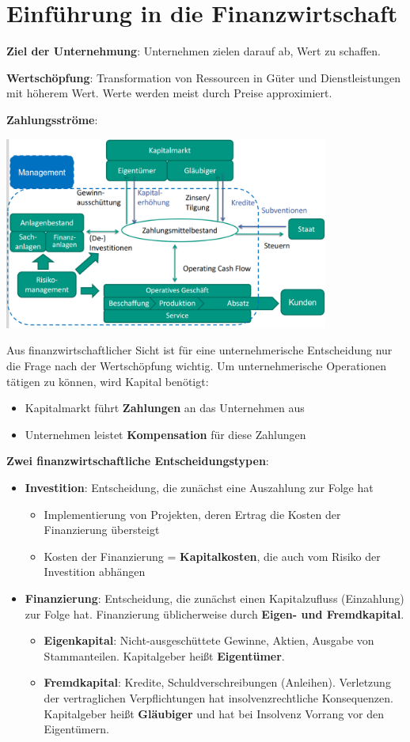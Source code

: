 \section{Einführung in die Finanzwirtschaft}

\textbf{Ziel der Unternehmung}: Unternehmen zielen darauf ab, Wert zu schaffen.

\textbf{Wertschöpfung}: Transformation von Ressourcen in Güter und Dienstleistungen mit höherem Wert. Werte werden meist durch Preise approximiert.

\textbf{Zahlungsströme}:
\begin{center}
	\includegraphics[width=0.8\textwidth]{images/payflow.png}
\end{center}
Aus finanzwirtschaftlicher Sicht ist für eine unternehmerische Entscheidung nur die Frage nach der Wertschöpfung wichtig.
Um unternehmerische Operationen tätigen zu können, wird Kapital benötigt:
\begin{itemize}
	\item Kapitalmarkt führt \textbf{Zahlungen} an das Unternehmen aus
	\item Unternehmen leistet \textbf{Kompensation} für diese Zahlungen
\end{itemize}
\bigskip
\textbf{Zwei finanzwirtschaftliche Entscheidungstypen}:
\begin{itemize}
	\item \textbf{Investition}: Entscheidung, die zunächst eine Auszahlung zur Folge hat
	\begin{itemize}
		\item Implementierung von Projekten, deren Ertrag die Kosten der Finanzierung übersteigt
		\item Kosten der Finanzierung = \textbf{Kapitalkosten}, die auch vom Risiko der Investition abhängen
	\end{itemize}
	\item \textbf{Finanzierung}: Entscheidung, die zunächst einen Kapitalzufluss (Einzahlung) zur Folge hat. Finanzierung üblicherweise durch \textbf{Eigen- und Fremdkapital}.
	\begin{itemize}
		\item \textbf{Eigenkapital}: Nicht-ausgeschüttete Gewinne, Aktien, Ausgabe von Stammanteilen. Kapitalgeber heißt \textbf{Eigentümer}.
		\item \textbf{Fremdkapital}: Kredite, Schuldverschreibungen (Anleihen). Verletzung der vertraglichen Verpflichtungen hat insolvenzrechtliche Konsequenzen. Kapitalgeber heißt \textbf{Gläubiger} und hat bei Insolvenz Vorrang vor den Eigentümern. 
	\end{itemize}
\end{itemize}
